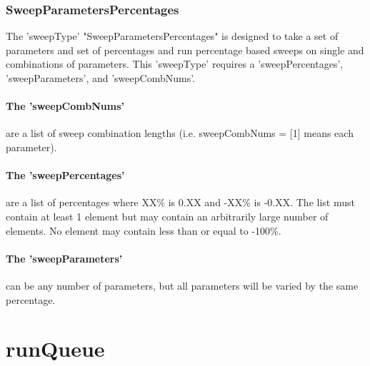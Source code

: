 \documentclass[12pt]{article}
\begin{document}
\subsubsection{SweepParametersPercentages}
The 'sweepType' "SweepParametersPercentages" is designed to take a set of parameters and set of percentages and run percentage based sweeps on single and combinations of parameters.
This 'sweepType' requires a 'sweepPercentages', 'sweepParameters', and 'sweepCombNums'.

\paragraph{The 'sweepCombNums'} are a list of sweep combination lengths (i.e. sweepCombNums = [1] means each parameter).
\paragraph{The 'sweepPercentages'} are a list of percentages   where XX\% is 0.XX and -XX\% is -0.XX. 
The list must contain at least 1 element but may contain an arbitrarily large number of elements.
No element may contain less than or equal to -100\%.
\paragraph{The 'sweepParameters'} can be any number of parameters, but all parameters will be varied by the same percentage.



\section{runQueue}
\end{document}

